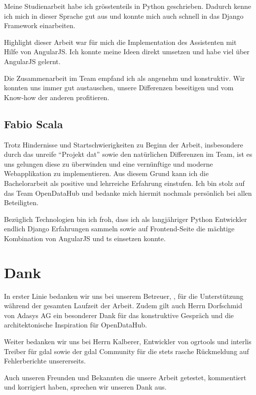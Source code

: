 Meine Studienarbeit habe ich grösstenteils in Python geschrieben. Dadurch kenne ich mich in dieser Sprache gut aus und konnte mich auch schnell in das Django Framework einarbeiten.

Highlight dieser Arbeit war für mich die Implementation des Assistenten mit Hilfe von AngularJS. Ich konnte meine Ideen direkt umsetzen und habe viel über AngularJS gelernt.

Die Zusammenarbeit im Team empfand ich als angenehm und konstruktiv. Wir konnten uns immer gut austauschen, unsere Differenzen beseitigen und vom Know-how der anderen profitieren.

\subsection{Fabio Scala}
Trotz Hindernisse und Startschwierigkeiten zu Beginn der Arbeit, insbesondere durch das unreife ``Projekt dat'' sowie den natürlichen Differenzen im Team, ist es uns gelungen diese zu überwinden und eine vernünftige und moderne Webapplikation zu implementieren. Aus diesem Grund kann ich die Bachelorarbeit als positive und lehrreiche Erfahrung einstufen. Ich bin stolz auf das Team OpenDataHub und bedanke mich hiermit nochmals persönlich bei allen Beteiligten.

Bezüglich Technologien bin ich froh, dass ich als langjähriger Python Entwickler endlich Django Erfahrungen sammeln sowie auf Frontend-Seite die mächtige Kombination von AngularJS und \gls{ts} einsetzen konnte.


\section{Dank}
In erster Linie bedanken wir uns bei unserem Betreuer, \proff, für die Unterstützung während der gesamten Laufzeit der Arbeit. Zudem gilt auch Herrn Dorfschmid von Adasys AG ein besonderer Dank für das konstruktive Gespräch und die architektonische Inspiration für OpenDataHub. 

Weiter bedanken wir uns bei Herrn Kalberer, Entwickler von ogrtools und \gls{interlis} Treiber für \gls{gdal} sowie der \gls{gdal} Community für die stets rasche Rückmeldung auf Fehlerberichte unsererseits.

Auch unseren Freunden und Bekannten die unsere Arbeit getestet, kommentiert und korrigiert haben, sprechen wir unseren Dank aus.
